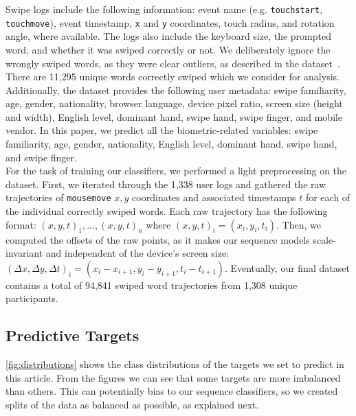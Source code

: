 \documentclass[sn-mathphys, pdflatex]{sn-jnl}
\begin{document}
Swipe logs include the following information:
event name (e.g. \texttt{touchstart}, \texttt{touchmove}),
event timestamp,
\texttt{x} and \texttt{y} coordinates,
touch radius,
and rotation angle, where available.
The logs also include the keyboard size, the prompted word, and whether it was swiped correctly or not.
We deliberately ignore the wrongly swiped words,
as they were clear outliers, as described in the dataset~\cite{Leiva21_swipe}.
There are 11,295 unique words correctly swiped which we consider for analysis.
%
Additionally, the dataset provides the following user metadata:
swipe familiarity, age, gender, nationality, browser language,
device pixel ratio, screen size (height and width), English level,
dominant hand, swipe hand, swipe finger, and mobile vendor.
In this paper, we predict all the biometric-related variables:
swipe familiarity, age, gender, nationality, English level, dominant hand, swipe hand, and swipe finger.\\

For the task of training our classifiers, we performed a light preprocessing on the dataset.
First, we iterated through the 1,338 user logs and gathered the raw trajectories of \texttt{mousemove} $x,y$ coordinates and associated timestamps $t$
for each of the individual correctly swiped words.
Each raw trajectory has the following format:
$(x,y,t)_1, \dots, (x,y,t)_n$ where $(x,y,t)_i = (x_{i}, y_{i}, t_{i})$.
Then, we computed the offsets of the raw points,
as it makes our sequence models scale-invariant and independent of the device's screen size:
$(\Delta x, \Delta y, \Delta t)_i = (x_{i} - x_{i+1}, y_{i} - y_{i+1}, t_{i} - t_{i+1})$.
Eventually, our final dataset contains a total of 94,841 swiped word trajectories from 1,308 unique participants.


\subsection{Predictive Targets}
\label{sec:targets}

\autoref{fig:distributions} shows the class distributions of the targets we set to predict in this article.
From the figures we can see that some targets are more imbalanced than others.
This can potentially bias to our sequence classifiers,
so we created splits of the data as balanced as possible, as explained next.
\end{document}
